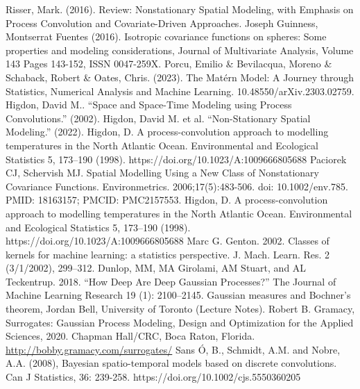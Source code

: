 \documentclass[12pt]{article}
\begin{document}
\begin{thebibliography}{20}
 Risser, Mark. (2016). Review: Nonstationary Spatial Modeling, with Emphasis on Process Convolution and Covariate-Driven Approaches. 
 Joseph Guinness, Montserrat Fuentes (2016). Isotropic covariance functions on spheres: Some properties and modeling considerations, Journal of Multivariate Analysis, Volume 143
Pages 143-152, ISSN 0047-259X.
 Porcu, Emilio \& Bevilacqua, Moreno \& Schaback, Robert \& Oates, Chris. (2023). The Mat\'ern Model: A Journey through Statistics, Numerical Analysis and Machine Learning. 10.48550/arXiv.2303.02759. 
 Higdon, David M.. “Space and Space-Time Modeling using Process Convolutions.” (2002).
 Higdon, David M. et al. “Non-Stationary Spatial Modeling.” (2022).
 Higdon, D. A process-convolution approach to modelling temperatures in the North Atlantic Ocean. Environmental and Ecological Statistics 5, 173–190 (1998). https://doi.org/10.1023/A:1009666805688
 Paciorek CJ, Schervish MJ. Spatial Modelling Using a New Class of Nonstationary Covariance Functions. Environmetrics. 2006;17(5):483-506. doi: 10.1002/env.785. PMID: 18163157; PMCID: PMC2157553.
 Higdon, D. A process-convolution approach to modelling temperatures in the North Atlantic Ocean. Environmental and Ecological Statistics 5, 173–190 (1998). https://doi.org/10.1023/A:1009666805688
 Marc G. Genton. 2002. Classes of kernels for machine learning: a statistics perspective. J. Mach. Learn. Res. 2 (3/1/2002), 299–312.
 Dunlop, MM, MA Girolami, AM Stuart, and AL Teckentrup. 2018. “How Deep Are Deep Gaussian Processes?” The Journal of Machine Learning Research 19 (1): 2100–2145.
 Gaussian measures and Bochner’s theorem, Jordan Bell, University of Toronto (Lecture Notes). 
 Robert B. Gramacy, Surrogates: Gaussian Process Modeling, Design and Optimization for the Applied Sciences, 2020. Chapman Hall/CRC, Boca Raton, Florida. \url{http://bobby.gramacy.com/surrogates/}
 Sans Ó, B., Schmidt, A.M. and Nobre, A.A. (2008), Bayesian spatio-temporal models based on discrete convolutions. Can J Statistics, 36: 239-258. https://doi.org/10.1002/cjs.5550360205
\end{thebibliography}
\end{document}
